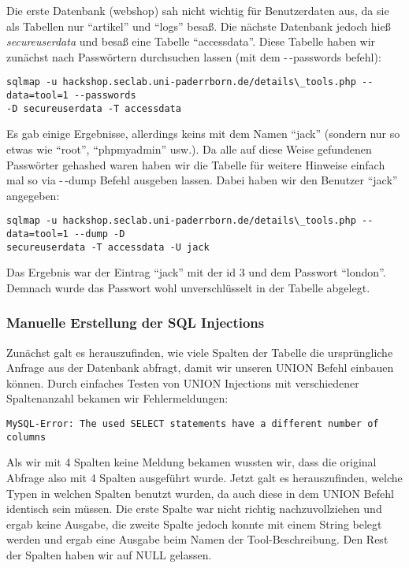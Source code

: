 \documentclass[10pt,a4paper]{article}
\begin{document}
Die erste Datenbank (webshop) sah nicht wichtig für Benutzerdaten aus, da sie als Tabellen nur "`artikel"' und "`logs"' besaß. Die nächste Datenbank jedoch hieß \textit{secureuserdata} und besaß eine Tabelle "`accessdata"'.
Diese Tabelle haben wir zunächst nach Passwörtern durchsuchen lassen (mit dem -\,-passwords befehl):

\begin{verbatim}
sqlmap -u hackshop.seclab.uni-paderrborn.de/details\_tools.php --data=tool=1 --passwords
-D secureuserdata -T accessdata
\end{verbatim}

Es gab einige Ergebnisse, allerdings keins mit dem Namen "`jack"' (sondern nur so etwas wie "`root"', "`phpmyadmin"' usw.). Da alle auf diese Weise gefundenen Passwörter gehashed waren haben wir die Tabelle für weitere Hinweise einfach mal so via -\,-dump Befehl ausgeben lassen. Dabei haben wir den Benutzer "`jack"' angegeben:

\begin{verbatim}
sqlmap -u hackshop.seclab.uni-paderrborn.de/details\_tools.php --data=tool=1 --dump -D
secureuserdata -T accessdata -U jack
\end{verbatim}

Das Ergebnis war der Eintrag "`jack"' mit der id 3 und dem Passwort "`london"'. Demnach wurde das Passwort wohl unverschlüsselt in der Tabelle abgelegt.


\subsubsection*{Manuelle Erstellung der SQL Injections}

Zunächst galt es herauszufinden, wie viele Spalten der Tabelle die ursprüngliche Anfrage aus der Datenbank abfragt, damit wir unseren UNION Befehl einbauen können. Durch einfaches Testen von UNION Injections mit verschiedener Spaltenanzahl bekamen wir Fehlermeldungen:

\begin{verbatim}
MySQL-Error: The used SELECT statements have a different number of columns
\end{verbatim}

Als wir mit 4 Spalten keine Meldung bekamen wussten wir, dass die original Abfrage also mit 4 Spalten ausgeführt wurde. Jetzt galt es herauszufinden, welche Typen in welchen Spalten benutzt wurden, da auch diese in dem UNION Befehl identisch sein müssen. Die erste Spalte war nicht richtig nachzuvollziehen und ergab keine Ausgabe, die zweite Spalte jedoch konnte mit einem String belegt werden und ergab eine Ausgabe beim Namen der Tool-Beschreibung. Den Rest der Spalten haben wir auf NULL gelassen.
\end{document}
